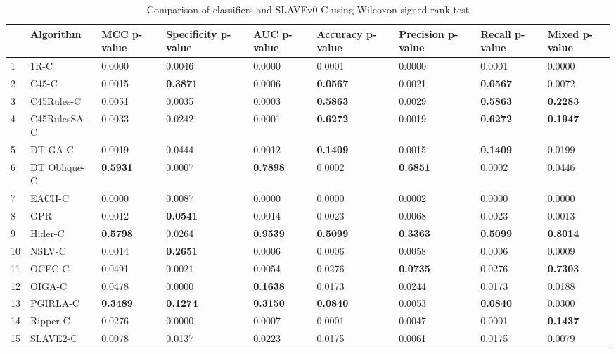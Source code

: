 \begin{table}
\footnotesize
\caption{Comparison of classifiers and SLAVEv0-C using Wilcoxon signed-rank test}
\label{tab:wilcoxon comparison}
\begin{tabular}{lllllllll}
\hline
 & Algorithm & MCC p-value & Specificity p-value & AUC p-value & Accuracy p-value & Precision p-value & Recall p-value & Mixed p-value \\
\hline
1 & 1R-C & 0.0000 & 0.0046 & 0.0000 & 0.0001 & 0.0000 & 0.0001 & 0.0000 \\
2 & C45-C & 0.0015 & \textbf{0.3871} & 0.0006 & \textbf{0.0567} & 0.0021 & \textbf{0.0567} & 0.0072 \\
3 & C45Rules-C & 0.0051 & 0.0035 & 0.0003 & \textbf{0.5863} & 0.0029 & \textbf{0.5863} & \textbf{0.2283} \\
4 & C45RulesSA-C & 0.0033 & 0.0242 & 0.0001 & \textbf{0.6272} & 0.0019 & \textbf{0.6272} & \textbf{0.1947} \\
5 & DT GA-C & 0.0019 & 0.0444 & 0.0012 & \textbf{0.1409} & 0.0015 & \textbf{0.1409} & 0.0199 \\
6 & DT Oblique-C & \textbf{0.5931} & 0.0007 & \textbf{0.7898} & 0.0002 & \textbf{0.6851} & 0.0002 & 0.0446 \\
7 & EACH-C & 0.0000 & 0.0087 & 0.0000 & 0.0000 & 0.0002 & 0.0000 & 0.0000 \\
8 & GPR & 0.0012 & \textbf{0.0541} & 0.0014 & 0.0023 & 0.0068 & 0.0023 & 0.0013 \\
9 & Hider-C & \textbf{0.5798} & 0.0264 & \textbf{0.9539} & \textbf{0.5099} & \textbf{0.3363} & \textbf{0.5099} & \textbf{0.8014} \\
10 & NSLV-C & 0.0014 & \textbf{0.2651} & 0.0006 & 0.0006 & 0.0058 & 0.0006 & 0.0009 \\
11 & OCEC-C & 0.0491 & 0.0021 & 0.0054 & 0.0276 & \textbf{0.0735} & 0.0276 & \textbf{0.7303} \\
12 & OIGA-C & 0.0478 & 0.0000 & \textbf{0.1638} & 0.0173 & 0.0244 & 0.0173 & 0.0188 \\
13 & PGIRLA-C & \textbf{0.3489} & \textbf{0.1274} & \textbf{0.3150} & \textbf{0.0840} & 0.0053 & \textbf{0.0840} & 0.0300 \\
14 & Ripper-C & 0.0276 & 0.0000 & 0.0007 & 0.0001 & 0.0047 & 0.0001 & \textbf{0.1437} \\
15 & SLAVE2-C & 0.0078 & 0.0137 & 0.0223 & 0.0175 & 0.0061 & 0.0175 & 0.0079 \\
\hline
\end{tabular}
\end{table}
